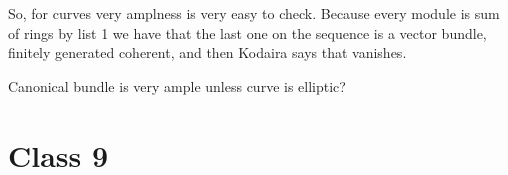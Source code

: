 \begin{remark}
	So, for curves very amplness is very easy to check. Because every module is sum of rings by list 1 we have that the last one on the sequence is a vector bundle, finitely generated coherent, and then Kodaira says that vanishes.
\end{remark}

Canonical bundle is very ample unless curve is elliptic?

\section{Class 9}







